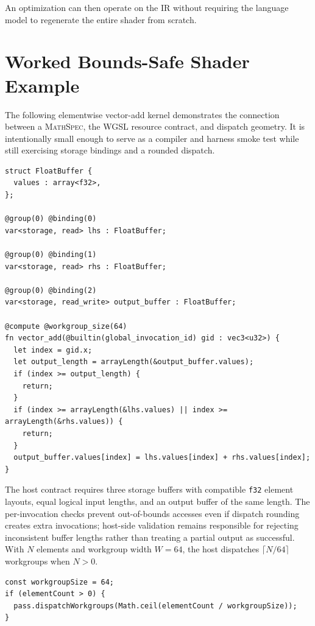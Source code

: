 \documentclass[11pt,a4paper,oneside]{report}
\newcommand{\MathSpec}{\textsc{MathSpec}}
\begin{document}
An optimization can then operate on the IR without requiring the language model to regenerate
the entire shader from scratch.

\section{Worked Bounds-Safe Shader Example}

The following elementwise vector-add kernel demonstrates the connection between a \MathSpec{},
the WGSL resource contract, and dispatch geometry. It is intentionally small enough to serve as a
compiler and harness smoke test while still exercising storage bindings and a rounded dispatch.

\begin{lstlisting}[language=WGSL,caption={Bounds-safe vector addition using runtime-sized storage arrays.}]
struct FloatBuffer {
  values : array<f32>,
};

@group(0) @binding(0)
var<storage, read> lhs : FloatBuffer;

@group(0) @binding(1)
var<storage, read> rhs : FloatBuffer;

@group(0) @binding(2)
var<storage, read_write> output_buffer : FloatBuffer;

@compute @workgroup_size(64)
fn vector_add(@builtin(global_invocation_id) gid : vec3<u32>) {
  let index = gid.x;
  let output_length = arrayLength(&output_buffer.values);
  if (index >= output_length) {
    return;
  }
  if (index >= arrayLength(&lhs.values) || index >= arrayLength(&rhs.values)) {
    return;
  }
  output_buffer.values[index] = lhs.values[index] + rhs.values[index];
}
\end{lstlisting}

The host contract requires three storage buffers with compatible \texttt{f32} element layouts,
equal logical input lengths, and an output buffer of the same length. The per-invocation checks
prevent out-of-bounds accesses even if dispatch rounding creates extra invocations; host-side
validation remains responsible for rejecting inconsistent buffer lengths rather than treating a
partial output as successful. With $N$ elements and workgroup width $W=64$, the host dispatches
$\lceil N/64\rceil$ workgroups when $N>0$.

\begin{lstlisting}[caption={Host-side dispatch rule corresponding to the shader above.}]
const workgroupSize = 64;
if (elementCount > 0) {
  pass.dispatchWorkgroups(Math.ceil(elementCount / workgroupSize));
}
\end{lstlisting}
\end{document}
